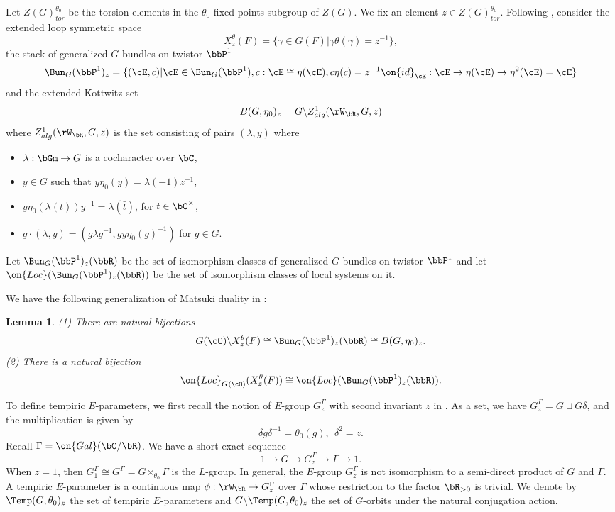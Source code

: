 \documentclass[12pt]{amsart}
\newtheorem{lem}[thm]{Lemma}
\theoremstyle{remark}
\begin{document}
Let $Z(G)^{\theta_0}_{tor}$
be the torsion elements in the $\theta_0$-fixed points subgroup of $Z(G)$.
We fix an element $z\in Z(G)^{\theta_0}_{tor}$.
Following \cite[Section 5.4.2]{CY},
consider the extended loop symmetric space 
\[X_z^\theta(F)=\{\gamma\in G(F)|\gamma\theta(\gamma)=z^{-1}\},\]
the stack of generalized $G$-bundles on twistor $\bbP^1$
\[\Bun_G(\bbP^1)_z=\{(\cE,c)|\cE\in\Bun_G(\bbP^1), c:\cE\cong\eta(\cE), c\eta(c)=z^{-1}\on{id}_\cE:\cE\to\eta(\cE)\to \eta^2(\cE)=\cE\}\]
and the extended Kottwitz set 
\[B(G,\eta_0)_z=G\backslash Z^1_{alg}(\rW_\bR,G,z)\]
where $Z^1_{alg}(\rW_\bR,G,z)$
is the set consisting of pairs $(\lambda,y)$ where 
\begin{itemize}
	\item [(i)] $\lambda:\bGm\rightarrow G$ is a cocharacter over $\bC$,
	\item [(ii)] $y\in G$ such that $y\eta_0(y)=\lambda(-1)z^{-1}$,
	\item [(iii)] $y\eta_0(\lambda(t)) y^{-1}=\lambda(\bar t)$, for $t\in\bC^\times$,
	\item [(iv)] $g\cdot (\lambda,y)=(g\lambda g^{-1},gy\eta_0(g)^{-1})$ for $g\in G$.
    \end{itemize}
Let $\Bun_G(\bbP^1)_{z}(\bbR)$ be the set of isomorphism classes of generalized $G$-bundles on twistor $\bbP^1$
and let $\on{Loc}(\Bun_G(\bbP^1)_{z}(\bbR))$ be the set of 
isomorphism classes of local systems on it.

We have the following generalization of Matsuki duality
in \cite[Section 5.4]{CY}:

\begin{lem}\label{extended}
(1) There are natural bijections
     \[G(\cO)\backslash X^{\theta }_z(F)\cong \Bun_G(\bbP^1)_{z}(\bbR)\cong B(G,\eta_0)_z. \]
(2) There is a natural bijection
\[\on{Loc}_{G^{}(\cO)}( X^{\theta }_z(F))\cong 
    \on{Loc}(\Bun_G(\bbP^1)_{z}(\bbR)).\]
\end{lem}







To define tempiric $E$-parameters, we first 
recall the notion of $E$-group $G^\Gamma_z$
with second invariant $z$
in \cite{ABV}.
As a set, we have 
$ G^\Gamma_z=G\sqcup G\delta$,
and the multiplication is given by 
\[\delta g\delta ^{-1}=\theta_0(g),\ \  \delta^2=z.\]
Recall $\Gamma=\on{Gal}(\bC/\bR)$. 
We have a short exact sequence 
\[1\to G\to G^\Gamma_z\to \Gamma\to 1.\]
When $z=1$, then $G_1^\Gamma\cong G^\Gamma= G\rtimes_{\theta_0}\Gamma$ is the $L$-group. In general, the $E$-group $G^\Gamma_z$
is not isomorphism to a semi-direct product of $G$ and $\Gamma$. A tempiric $E$-parameter is a 
continuous map $\phi:\rW_\bR\to G^\Gamma_z$ over $\Gamma$
whose restriction to the factor $\bR_{>0}$ is trivial.
We denote by $\Temp(G,\theta_0)_z$ the set of 
tempiric $E$-parameters and 
$G\backslash\Temp(G,\theta_0)_z$ the set of $G$-orbits under the natural conjugation action.
\end{document}
